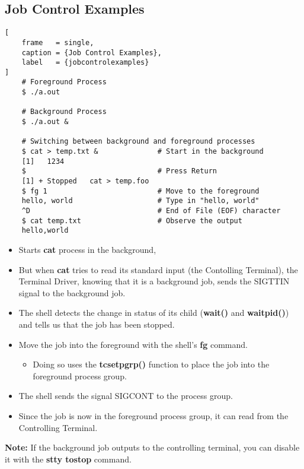 \documentclass{article}
\begin{document}
\subsection{Job Control Examples}
\begin{lstlisting}[
    frame   = single,
    caption = {Job Control Examples},
    label   = {jobcontrolexamples}
]
    # Foreground Process
    $ ./a.out

    # Background Process
    $ ./a.out &

    # Switching between background and foreground processes
    $ cat > temp.txt &              # Start in the background
    [1]   1234
    $                               # Press Return 
    [1] + Stopped   cat > temp.foo  
    $ fg 1                          # Move to the foreground
    hello, world                    # Type in "hello, world"
    ^D                              # End of File (EOF) character
    $ cat temp.txt                  # Observe the output
    hello,world
\end{lstlisting}
\begin{itemize}
    \item Starts \textbf{cat} process in the background, 
    \item But when \textbf{cat} tries to read its standard input (the Contolling 
        Terminal), the Terminal Driver, knowing that it is a background job, sends
        the SIGTTIN signal to the background job.
    \item The shell detects the change in status of its child (\textbf{wait()}
        and \textbf{waitpid()}) and tells us that the job has been stopped.
    \item Move the job into the foreground with the shell's \textbf{fg} command.
            \begin{itemize}
                \item Doing so uses the \textbf{tcsetpgrp()} function to place the
                    job into the foreground process group.
            \end{itemize}
    \item The shell sends the signal SIGCONT to the process group.
    \item Since the job is now in the foreground process group, it can read from 
        the Controlling Terminal.\newline
\end{itemize}
\textbf{Note:} If the background job outputs to the controlling terminal, you can 
disable it with the \textbf{stty tostop} command.
\end{document}
